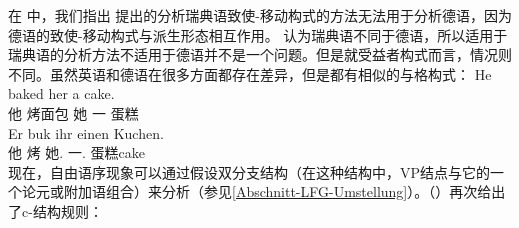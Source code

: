     在 \citet{MWArgSt}中，我们指出 \citet{ADT2008a,ADT2013a}提出的分析瑞典语致使-移动构式的方法无法用于分析德语，因为德语的致使-移动构式与派生形态相互作用。 \citet{AT2014a}认为瑞典语不同于德语，所以适用于瑞典语的分析方法不适用于德语并不是一个问题。但是就受益者构式而言，情况则不同。虽然英语和德语在很多方面都存在差异，但是都有相似的与格构式：
\eal
\ex 
\gll He baked her a cake.\\
     他 烤面包 她 一 蛋糕\\
\ex
\label{ex-er-buk-ihr-einen-kuchen} 
\gll Er buk   ihr        einen Kuchen.\\
     他 烤 她.\dat{} 一.\acc{} 蛋糕cake\\
\zl
现在，自由语序现象可以通过假设双分支结构（在这种结构中，VP结点与它的一个论元或附加语组合）来分析（参见\ref{Abschnitt-LFG-Umstellung}）。（）再次给出了c-结构规则：

